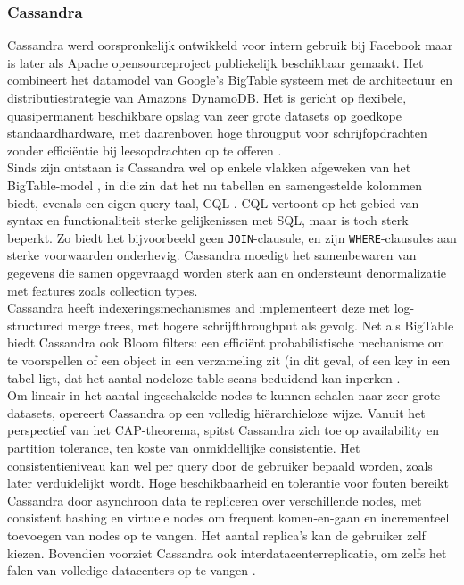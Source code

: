 \subsubsection{Cassandra}

Cassandra werd oorspronkelijk ontwikkeld voor intern gebruik bij Facebook maar is later als Apache opensourceproject publiekelijk beschikbaar gemaakt. Het combineert het datamodel van Google's BigTable systeem met de architectuur en distributiestrategie van Amazons DynamoDB. Het is gericht op flexibele, quasipermanent beschikbare opslag van zeer grote datasets op goedkope standaardhardware, met daarenboven hoge througput voor schrijfopdrachten zonder effici\"entie bij leesopdrachten op te offeren \cite{borthakur2011apache}.\\
Sinds zijn ontstaan is Cassandra wel op enkele vlakken afgeweken van het BigTable-model \cite{cassandra_then&now}, in die zin dat het nu tabellen en samengestelde kolommen
biedt, evenals een eigen query taal, CQL \cite{cassandra_CQL}. CQL vertoont op het gebied van syntax en functionaliteit sterke gelijkenissen met SQL, maar is toch sterk beperkt. Zo biedt het bijvoorbeeld geen \texttt{JOIN}-clausule, en zijn \texttt{WHERE}-clausules aan sterke voorwaarden onderhevig. Cassandra moedigt het samenbewaren van gegevens die samen opgevraagd worden sterk aan en ondersteunt denormalizatie met features zoals collection types.\\
Cassandra heeft indexeringsmechanismes and implementeert deze met log-structured merge trees, met hogere schrijfthroughput als gevolg.
Net als BigTable biedt Cassandra ook Bloom filters: een effici\"ent probabilistische mechanisme om te voorspellen of een object in een verzameling zit (in dit geval, of een key in een tabel ligt, dat het aantal nodeloze table scans beduidend kan inperken \cite{mullin1983second}.\\
Om lineair in het aantal ingeschakelde nodes te kunnen schalen naar zeer grote datasets, opereert Cassandra op een volledig hi\"erarchieloze wijze. Vanuit het perspectief van het CAP-theorema, spitst Cassandra zich toe op availability en partition tolerance, ten koste van onmiddellijke consistentie. Het consistentieniveau kan wel per query door de gebruiker bepaald worden, zoals later verduidelijkt wordt. Hoge beschikbaarheid en tolerantie voor fouten bereikt Cassandra door asynchroon data te repliceren over verschillende nodes, met consistent hashing en virtuele nodes om frequent komen-en-gaan en incrementeel toevoegen van nodes op te vangen. Het aantal replica's kan de gebruiker zelf kiezen. Bovendien voorziet Cassandra ook interdatacenterreplicatie, om zelfs het falen van volledige datacenters op te vangen \cite{decandia2007dynamo} \cite{lakshman2010cassandra} \cite{cassandra_then&now}.\\
